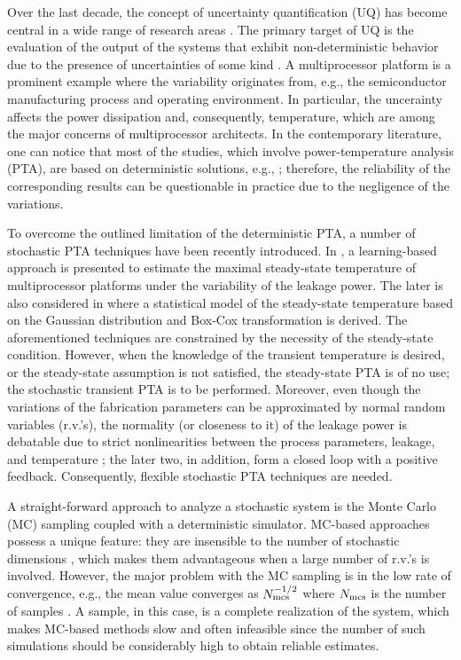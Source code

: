 Over the last decade, the concept of uncertainty quantification (UQ) has become central in a wide range of research areas \cite{xiu2009}. The primary target of UQ is the evaluation of the output of the systems that exhibit non-deterministic behavior due to the presence of uncertainties of some kind \cite{eldred2009}. A multiprocessor platform is a prominent example where the variability originates from, e.g., the semiconductor manufacturing process and operating environment. In particular, the uncerainty affects the power dissipation and, consequently, temperature, which are among the major concerns of multiprocessor architects. In the contemporary literature, one can notice that most of the studies, which involve power-temperature analysis (PTA), are based on deterministic solutions, e.g., \cite{ukhov2012}; therefore, the reliability of the corresponding results can be questionable in practice due to the negligence of the variations.

To overcome the outlined limitation of the deterministic PTA, a number of stochastic PTA techniques have been recently introduced. In \cite{juan2011}, a learning-based approach is presented to estimate the maximal steady-state temperature of multiprocessor platforms under the variability of the leakage power. The later is also considered in \cite{juan2012} where a statistical model of the steady-state temperature based on the Gaussian distribution and Box-Cox transformation is derived. The aforementioned techniques are constrained by the necessity of the steady-state condition. However, when the knowledge of the transient temperature is desired, or the steady-state assumption is not satisfied, the steady-state PTA is of no use; the stochastic transient PTA is to be performed. Moreover, even though the variations of the fabrication parameters can be approximated by normal random variables (r.v.'s), the normality (or closeness to it) of the leakage power is debatable due to strict nonlinearities between the process parameters, leakage, and temperature \cite{liu2007}; the later two, in addition, form a closed loop with a positive feedback. Consequently, flexible stochastic PTA techniques are needed.

A straight-forward approach to analyze a stochastic system is the Monte Carlo (MC) sampling coupled with a deterministic simulator. MC-based approaches possess a unique feature: they are insensible to the number of stochastic dimensions \cite{maitre2010}, which makes them advantageous when a large number of r.v.'s is involved. However, the major problem with the MC sampling is in the low rate of convergence, e.g., the mean value converges as $N_\text{mcs}^{-{{1}/{2}}}$ where $N_\text{mcs}$ is the number of samples \cite{xiu2009, maitre2010}. A sample, in this case, is a complete realization of the system, which makes MC-based methods slow and often infeasible since the number of such simulations should be considerably high to obtain reliable estimates.

